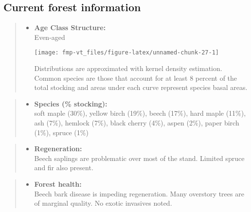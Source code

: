 \documentclass[]{tufte-handout}
\providecommand{\tightlist}{%
  \setlength{\itemsep}{0pt}\setlength{\parskip}{0pt}}
\begin{document}
\subsection{Current forest
information}\label{current-forest-information-5}

\begin{quote}
\begin{itemize}
\tightlist
\item
  \textbf{Age Class Structure:}\\
  \vspace{2pt} Even-aged\\

  \begin{marginfigure}
  \texttt{[image: fmp-vt\_files/figure-latex/unnamed-chunk-27-1]} \caption[Distributions are approximated with kernel density estimation]{Distributions are approximated with kernel density estimation. Common species are those that account for at least 8 percent of the total stocking and areas under each curve represent species basal areas.}\label{fig:unnamed-chunk-27}
  \end{marginfigure}
\end{itemize}
\end{quote}

\begin{quote}
\begin{itemize}
\tightlist
\item
  \textbf{Species (\% stocking):}\\
  \vspace{2pt} soft maple (30\%), yellow birch (19\%), beech (17\%),
  hard maple (11\%), ash (7\%), hemlock (7\%), black cherry (4\%), aspen
  (2\%), paper birch (1\%), spruce (1\%)
\end{itemize}
\end{quote}

\begin{quote}
\begin{itemize}
\tightlist
\item
  \textbf{Regeneration:}\\
  \vspace{2pt} Beech saplings are problematic over most of the stand.
  Limited spruce and fir also present.
\end{itemize}
\end{quote}

\begin{quote}
\begin{itemize}
\tightlist
\item
  \textbf{Forest health:}\\
  \vspace{2pt} Beech bark disease is impeding regeneration. Many
  overstory trees are of marginal quality. No exotic invasives noted.
\end{itemize}
\end{quote}
\end{document}
